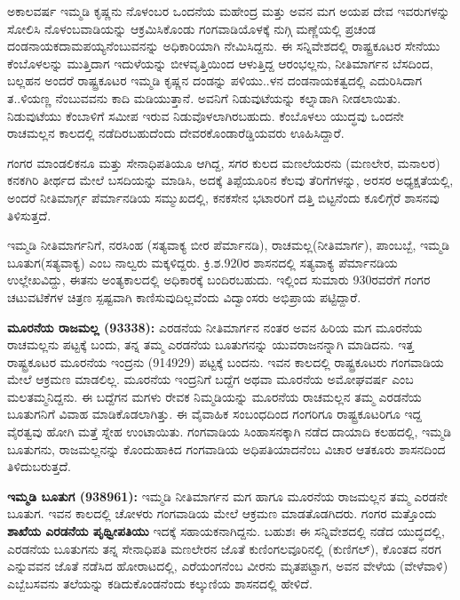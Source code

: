 ಅಕಾಲವರ್ಷ ಇಮ್ಮಡಿ ಕೃಷ್ಣನು ನೊಳಂಬರ ಒಂದನೆಯ ಮಹೇಂದ್ರ ಮತ್ತು ಅವನ ಮಗ ಅಯಪ ದೇವ ಇವರುಗಳನ್ನು ಸೋಲಿಸಿ ನೊಳಂಬವಾಡಿಯನ್ನು ಆಕ್ರಮಿಸಿಕೊಂಡು ಗಂಗವಾಡಿಯೊಳಕ್ಕೆ ನುಗ್ಗಿ ಮಣ್ಣೆಯಲ್ಲಿ ಪ್ರಚಂಡ ದಂಡನಾಯಕ\break ದಾಮಪಯ್ಯನೆಂಬುವನನ್ನು ಅಧಿಕಾರಿಯಾಗಿ ನೇಮಿಸಿದ್ದನು. ಈ ಸನ್ನಿವೇಶದಲ್ಲಿ ರಾಷ್ಟ್ರಕೂಟರ ಸೇನೆಯು ಕೆಂಬೊಳಲನ್ನು ಮುತ್ತಿದಾಗ ಇದುಳೆಯನ್ನು ಬೀಳವೃತ್ತಿಯಿಂದ ಆಳುತ್ತಿದ್ದ ಆರಂಭಲ್ಲನು, ನೀತಿಮಾರ್ಗನ ಬೆಸದಿಂದ, ಬಲ್ಲಹನ ಅಂದರೆ ರಾಷ್ಟ್ರಕೂಟರ ಇಮ್ಮಡಿ ಕೃಷ್ಣನ ದಂಡನ್ನು ಪಳಿಯು..ಳನ ದಂಡನಾಯಕತ್ವದಲ್ಲಿ ಎದುರಿಸಿದಾಗ ತ..ಳಿಯಣ್ಣ ನೆಂಬುವವನು ಕಾದಿ ಮಡಿಯುತ್ತಾನೆ. ಅವನಿಗೆ ನಿಡುವುಟೆಯನ್ನು ಕಲ್ನಾಡಾಗಿ ನೀಡಲಾಯಿತು. ನಿಡುವುಟೆಯು ಕೆಂಬಾಳಿಗೆ ಸಮೀಪ ಇರುವ ನಿಡುವೊಳಲಾಗಿರಬಹುದು. ಕೆಂಬೊಳಲು ಯುದ್ಧವು ಒಂದನೇ ರಾಚಮಲ್ಲನ ಕಾಲದಲ್ಲಿ ನಡೆದಿರಬಹುದೆಂದು ದೇವರಕೊಂಡಾರೆಡ್ಡಿಯವರು ಊಹಿಸಿದ್ದಾರೆ.

ಗಂಗರ ಮಾಂಡಲಿಕನೂ ಮತ್ತು ಸೇನಾಧಿಪತಿಯೂ ಆಗಿದ್ದ, ಸಗರ ಕುಲದ ಮಣಲೆಯರನು (ಮಣಲೇರ, ಮನಾಲರ) ಕನಕಗಿರಿ ತೀರ್ಥದ ಮೇಲೆ ಬಸದಿಯನ್ನು ಮಾಡಿಸಿ, ಅದಕ್ಕೆ ತಿಪ್ಪೆಯೂರಿನ ಕೆಲವು ತೆರಿಗೆಗಳನ್ನು, ಅರಸರ ಅಧ್ಯಕ್ಷತೆಯಲ್ಲಿ, ಅಂದರೆ ನೀತಿಮಾರ್ಗ್ಗ ಪೆರ್ಮಾನಡಿಯ ಸಮ್ಮುಖದಲ್ಲಿ, ಕನಕಸೇನ ಭಟಾರರಿಗೆ ದತ್ತಿ ಬಿಟ್ಟನೆಂದು ಕೂಲಿಗ್ಗೆರೆ ಶಾಸನವು ತಿಳಿಸುತ್ತದೆ.

ಇಮ್ಮಡಿ ನೀತಿಮಾರ್ಗನಿಗೆ, ನರಸಿಂಹ (ಸತ್ಯವಾಕ್ಯ ಬೀರ ಪೆರ್ಮಾನಡಿ), ರಾಚಮಲ್ಲ(ನೀತಿಮಾರ್ಗ), ಪಾಂಬಬ್ಬೆ, ಇಮ್ಮಡಿ ಬೂತುಗ(ಸತ್ಯವಾಕ್ಯ) ಎಂಬ ನಾಲ್ವರು ಮಕ್ಕಳಿದ್ದರು. ಕ್ರಿ.ಶ.920ರ ಶಾಸನದಲ್ಲಿ ಸತ್ಯವಾಕ್ಯ ಪೆರ್ಮಾನಡಿಯ ಉಲ್ಲೇಖವಿದ್ದು, ಈತನು ಅಂತ್ಯಕಾಲದಲ್ಲಿ ಅಧಿಕಾರಕ್ಕೆ ಬಂದಿರಬಹುದು. ಇಲ್ಲಿಂದ ಸುಮಾರು 930ರವರೆಗೆ ಗಂಗರ ಚಟುವಟಿಕೆಗಳ ಚಿತ್ರಣ ಸ್ಪಷ್ಟವಾಗಿ ಕಾಣಿಸುವುದಿಲ್ಲವೆಂದು ವಿದ್ವಾಂಸರು ಅಭಿಪ್ರಾಯ ಪಟ್ಟಿದ್ದಾರೆ.

\textbf{ ಮೂರನೆಯ ರಾಜಮಲ್ಲ (93338):} ಎರಡನೆಯ ನೀತಿಮಾರ್ಗನ ನಂತರ ಅವನ ಹಿರಿಯ ಮಗ ಮೂರನೆಯ ರಾಚಮಲ್ಲನು ಪಟ್ಟಕ್ಕೆ ಬಂದು, ತನ್ನ ತಮ್ಮ ಎರಡನೆಯ ಬೂತುಗನನ್ನು ಯುವರಾಜನನ್ನಾಗಿ ಮಾಡಿದನು. ಇತ್ತ ರಾಷ್ಟ್ರಕೂಟರ ಮೂರನೆಯ ಇಂದ್ರನು (914929) ಪಟ್ಟಕ್ಕೆ ಬಂದನು. ಇವನ ಕಾಲದಲ್ಲಿ ರಾಷ್ಟ್ರಕೂಟರು ಗಂಗವಾಡಿಯ ಮೇಲೆ ಆಕ್ರಮಣ ಮಾಡಲಿಲ್ಲ. ಮೂರನೆಯ ಇಂದ್ರನಿಗೆ ಬದ್ದೆಗ ಅಥವಾ ಮೂರನೆಯ ಅಮೋಘವರ್ಷ ಎಂಬ ಮಲತಮ್ಮನಿದ್ದನು. ಈ ಬದ್ದೆಗನ ಮಗಳು ರೇವಕ ನಿಮ್ಮಡಿಯನ್ನು ಮೂರನೆಯ ರಾಚಮಲ್ಲನ ತಮ್ಮ ಎರಡನೆಯ ಬೂತುಗನಿಗೆ ವಿವಾಹ ಮಾಡಿಕೊಡಲಾಗಿತ್ತು. ಈ ವೈವಾಹಿಕ ಸಂಬಂಧದಿಂದ ಗಂಗರಿಗೂ ರಾಷ್ಟ್ರಕೂಟರಿಗೂ ಇದ್ದ ವೈರತ್ವವು ಹೋಗಿ ಮತ್ತೆ ಸ್ನೇಹ ಉಂಟಾಯಿತು. ಗಂಗವಾಡಿಯ ಸಿಂಹಾಸನಕ್ಕಾಗಿ ನಡೆದ ದಾಯಾದಿ ಕಲಹದಲ್ಲಿ, ಇಮ್ಮಡಿ ಬೂತುಗನು, ರಾಜಮಲ್ಲನನ್ನು ಕೊಂದುಹಾಕಿದ ಗಂಗವಾಡಿಯ ಅಧಿಪತಿಯಾದನೆಂಬ ವಿಚಾರ ಆತಕೂರು ಶಾಸನದಿಂದ ತಿಳಿದುಬರುತ್ತದೆ.

\textbf{ ಇಮ್ಮಡಿ ಬೂತುಗ (938961):} ಇಮ್ಮಡಿ ನೀತಿಮಾರ್ಗನ ಮಗ ಹಾಗೂ ಮೂರನೆಯ ರಾಜಮಲ್ಲನ ತಮ್ಮ ಎರಡನೇ ಬೂತುಗ. ಇವನ ಕಾಲದಲ್ಲಿ ಚೋಳರು ಗಂಗವಾಡಿಯ ಮೇಲೆ ಆಕ್ರಮಣ ಮಾಡತೊಡಗಿದರು. ಗಂಗರ ಮತ್ತೊಂದು \textbf{ಶಾಖೆಯ ಎರಡನೆಯ ಪೃಥ್ವೀಪತಿಯು} ಇದಕ್ಕೆ ಸಹಾಯಕನಾಗಿದ್ದನು. ಬಹುಶಃ ಈ ಸನ್ನಿವೇಶದಲ್ಲಿ ನಡೆದ ಯುದ್ಧದಲ್ಲಿ, ಎರಡನೆಯ ಬೂತುಗನು ತನ್ನ ಸೇನಾಧಿಪತಿ ಮಣಲೇರನ ಜೊತೆ ಕುಣಿಂಗಲವೂರಿನಲ್ಲಿ (ಕುಣಿಗಲ್​), ಕೊಂತದ ನರಗ ಎನ್ನುವವನ ಜೊತೆ ನಡೆಸಿದ ಹೋರಾಟದಲ್ಲಿ, ಎರೆಯಂಗನೆಂಬ ವೀರನು ಮೃತಪಟ್ಟಾಗ, ಅವನ ವೇಳೆಯ (ವೇಳೆವಾಳಿ) ಎಬ್ಬೆಬಸವನು ತಲೆಯನ್ನು ಕಡಿದುಕೊಂಡನೆಂದು ಕಲ್ಕುಣಿಯ ಶಾಸನದಲ್ಲಿ ಹೇಳಿದೆ.

